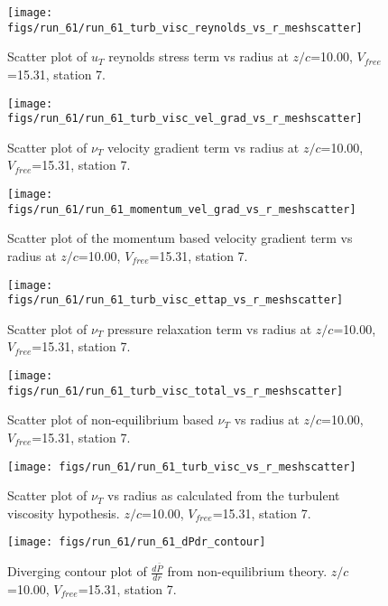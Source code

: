 \begin{figure}[H]
\centering
\texttt{[image: figs/run\_61/run\_61\_turb\_visc\_reynolds\_vs\_r\_meshscatter]}
\caption{Scatter plot of $
u_T$ reynolds stress term vs radius at $z/c$=10.00, $V_{free}$=15.31, station 7.}
\end{figure}


\begin{figure}[H]
\centering
\texttt{[image: figs/run\_61/run\_61\_turb\_visc\_vel\_grad\_vs\_r\_meshscatter]}
\caption{Scatter plot of $\nu_T$ velocity gradient term vs radius at $z/c$=10.00, $V_{free}$=15.31, station 7.}
\end{figure}


\begin{figure}[H]
\centering
\texttt{[image: figs/run\_61/run\_61\_momentum\_vel\_grad\_vs\_r\_meshscatter]}
\caption{Scatter plot of the momentum based velocity gradient term vs radius at $z/c$=10.00, $V_{free}$=15.31, station 7.}
\end{figure}


\begin{figure}[H]
\centering
\texttt{[image: figs/run\_61/run\_61\_turb\_visc\_ettap\_vs\_r\_meshscatter]}
\caption{Scatter plot of $\nu_T$ pressure relaxation term vs radius at $z/c$=10.00, $V_{free}$=15.31, station 7.}
\end{figure}


\begin{figure}[H]
\centering
\texttt{[image: figs/run\_61/run\_61\_turb\_visc\_total\_vs\_r\_meshscatter]}
\caption{Scatter plot of non-equilibrium based $\nu_T$ vs radius at $z/c$=10.00, $V_{free}$=15.31, station 7.}
\end{figure}


\begin{figure}[H]
\centering
\texttt{[image: figs/run\_61/run\_61\_turb\_visc\_vs\_r\_meshscatter]}
\caption{Scatter plot of $\nu_T$ vs radius as calculated from the turbulent viscosity hypothesis. $z/c$=10.00, $V_{free}$=15.31, station 7.}
\end{figure}


\begin{figure}[H]
\centering
\texttt{[image: figs/run\_61/run\_61\_dPdr\_contour]}
\caption{Diverging contour plot of $\frac{d\bar{P}}{dr}$ from non-equilibrium theory. $z/c$=10.00, $V_{free}$=15.31, station 7.}
\end{figure}


